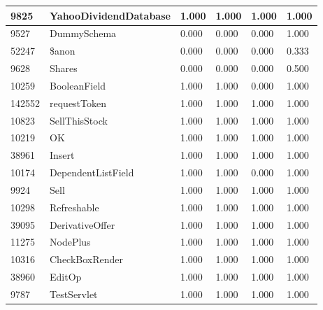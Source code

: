 \documentclass[a4paper]{article}
\newlength{\DUtablewidth} %
\begin{document}
\begin{longtable*}[c]{|p{0.160\DUtablewidth}|p{0.160\DUtablewidth}|p{0.160\DUtablewidth}|p{0.160\DUtablewidth}|p{0.160\DUtablewidth}|p{0.160\DUtablewidth}|}
9825
 & 
YahooDividendDatabase
 & 
1.000
 & 
1.000
 & 
1.000
 & 
1.000
 \\
\hline

9527
 & 
DummySchema
 & 
0.000
 & 
0.000
 & 
0.000
 & 
1.000
 \\
\hline

52247
 & 
\$anon
 & 
0.000
 & 
0.000
 & 
0.000
 & 
0.333
 \\
\hline

9628
 & 
Shares
 & 
0.000
 & 
0.000
 & 
0.000
 & 
0.500
 \\
\hline

10259
 & 
BooleanField
 & 
1.000
 & 
1.000
 & 
0.000
 & 
1.000
 \\
\hline

142552
 & 
requestToken
 & 
1.000
 & 
1.000
 & 
1.000
 & 
1.000
 \\
\hline

10823
 & 
SellThisStock
 & 
1.000
 & 
1.000
 & 
1.000
 & 
1.000
 \\
\hline

10219
 & 
OK
 & 
1.000
 & 
1.000
 & 
1.000
 & 
1.000
 \\
\hline

38961
 & 
Insert
 & 
1.000
 & 
1.000
 & 
1.000
 & 
1.000
 \\
\hline

10174
 & 
DependentListField
 & 
1.000
 & 
1.000
 & 
0.000
 & 
1.000
 \\
\hline

9924
 & 
Sell
 & 
1.000
 & 
1.000
 & 
1.000
 & 
1.000
 \\
\hline

10298
 & 
Refreshable
 & 
1.000
 & 
1.000
 & 
1.000
 & 
1.000
 \\
\hline

39095
 & 
DerivativeOffer
 & 
1.000
 & 
1.000
 & 
1.000
 & 
1.000
 \\
\hline

11275
 & 
NodePlus
 & 
1.000
 & 
1.000
 & 
1.000
 & 
1.000
 \\
\hline

10316
 & 
CheckBoxRender
 & 
1.000
 & 
1.000
 & 
1.000
 & 
1.000
 \\
\hline

38960
 & 
EditOp
 & 
1.000
 & 
1.000
 & 
1.000
 & 
1.000
 \\
\hline

9787
 & 
TestServlet
 & 
1.000
 & 
1.000
 & 
1.000
 & 
1.000
 \\
\hline


\end{longtable*}
\end{document}
